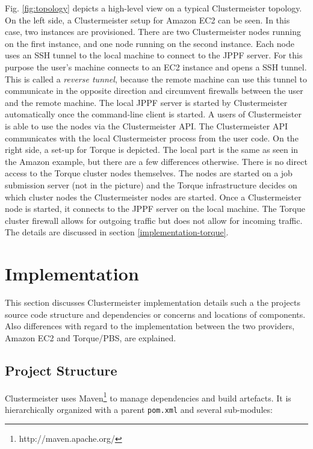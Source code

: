 \documentclass[english]{uzhpub}
\begin{document}
Fig. \ref{fig:topology} depicts a high-level view on a typical Clustermeister topology. On the left side, a Clustermeister setup for Amazon EC2 can be seen. In this case, two instances are provisioned. There are two Clustermeister nodes running on the first instance, and one node running on the second instance. Each node uses an SSH tunnel to the local machine to connect to the JPPF server. For this purpose the user's machine connects to an EC2 instance and opens a SSH tunnel. This is called a \textit{reverse tunnel}, because the remote machine can use this tunnel to communicate in the opposite direction and circumvent firewalls between the user and the remote machine. The local JPPF server is started by Clustermeister automatically once the command-line client is started. A users of Clustermeister is able to use the nodes via the Clustermeister API. The Clustermeister API communicates with the local Clustermeister process from the user code. On the right side, a set-up for Torque is depicted. The local part is the same as seen in the Amazon example, but there are a few differences otherwise. There is no direct access to the Torque cluster nodes themselves. The nodes are started on a job submission server (not in the picture) and the Torque infrastructure decides on which cluster nodes the Clustermeister nodes are started. Once a Clustermeister node is started, it connects to the JPPF server on the local machine. The Torque cluster firewall allows for outgoing traffic but does not allow for incoming traffic. The details are discussed in section \ref{implementation-torque}.

\section{Implementation}
\label{implementation}


This section discusses Clustermeister implementation details such a the projects source code structure and dependencies or concerns and locations of components. Also differences with regard to the implementation between the two providers, Amazon EC2 and Torque/PBS, are explained.

\subsection{Project Structure}
\label{structure}

Clustermeister uses Maven\footnote{http://maven.apache.org/} to manage dependencies and build artefacts. It is hierarchically organized with a parent \texttt{pom.xml} and several sub-modules:
\end{document}
